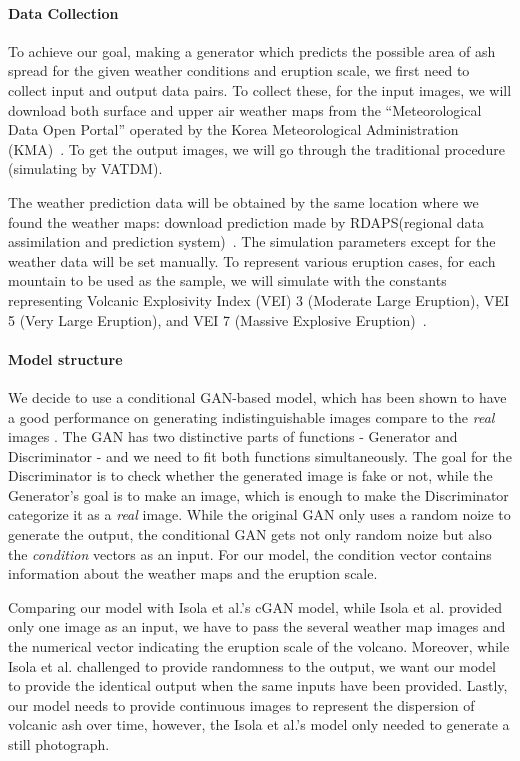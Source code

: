 \documentclass{article}
\begin{document}
\begin{doublespacing}
{  \paragraph{Data Collection}
  To achieve our goal, making a generator which predicts the possible area of ash spread for the 
  given weather conditions and eruption scale, we first need to collect input and output data pairs.
  To collect these, for the input images, we will download both surface and upper air weather maps 
  from the “Meteorological Data Open Portal” operated by the Korea Meteorological Administration 
  (KMA)~\cite{MDOP}. To get the output images, we will go through the traditional procedure 
  (simulating by VATDM).
  
  The weather prediction data will be obtained by the same location where we found the weather maps:
  download prediction made by RDAPS(regional data assimilation and prediction system)~\cite{MDOP}.
  The simulation parameters except for the weather data will be set manually. To represent various 
  eruption cases, for each mountain to be used as the sample, we will simulate with the constants 
  representing Volcanic Explosivity Index (VEI) 3 (Moderate Large Eruption), VEI 5 (Very Large 
  Eruption), and VEI 7 (Massive Explosive Eruption)~\cite[p.1232]{Newhall1982}. 

  \paragraph{Model structure}
  We decide to use a conditional GAN-based model, which has been shown to have a good performance on 
  generating indistinguishable images compare to the \emph{real} images 
  \cite{isola2016imagetoimage}. The GAN has two distinctive parts of functions - Generator and 
  Discriminator - and we need to fit both functions simultaneously. The goal for the Discriminator 
  is to check whether the generated image is fake or not, while the Generator's goal is to make an 
  image, which is enough to make the Discriminator categorize it as a \emph{real} image. While the 
  original GAN only uses a random noize to generate the output, the conditional GAN gets not only 
  random noize but also the \emph{condition} vectors as an input. For our model, the condition 
  vector contains information about the weather maps and the eruption scale.

  Comparing our model with Isola et al.\cite{isola2016imagetoimage}'s cGAN model, while Isola et 
  al. provided only one image as an input, we have to pass the several weather map images and the 
  numerical vector indicating the eruption scale of the volcano. Moreover, while Isola et 
  al.\cite{isola2016imagetoimage} challenged to provide randomness to the output, we want our model 
  to provide the identical output when the same inputs have been provided. Lastly, our model needs 
  to provide continuous images to represent the dispersion of volcanic ash over time, however, the 
  Isola et al.\cite{isola2016imagetoimage}'s model only needed to generate a still photograph.

}
\end{doublespacing}
\end{document}
